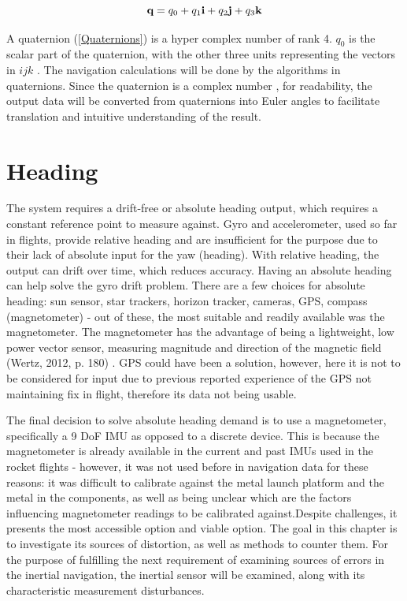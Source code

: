\begin{equation}\label{Quaternions}
	\textbf q = q_0 + q_1\textbf{i} + q_2\textbf{j} + q_3\textbf{k} 
\end{equation}

A quaternion (\ref{Quaternions}) is a hyper complex number of rank 4. $ {q_0} $ is the scalar part of the quaternion, with the other three units representing the vectors in ${i j k} $  \cite{fresk2013full}. The navigation calculations will be done by the algorithms in quaternions. Since the quaternion  is  a  complex  number \cite{fresk2013full}, for readability, the output data will be converted from quaternions into Euler angles to facilitate translation and intuitive understanding of the result.

\section{Heading}
 
The system requires a drift-free or absolute heading output, which requires a constant reference point to measure against. Gyro and accelerometer, used so far in flights, provide relative heading and are insufficient for the purpose due to their lack of absolute input for the yaw (heading). With relative heading, the output can drift over time, which reduces accuracy. Having an absolute heading can help solve the gyro drift problem. There are a few choices for absolute heading: sun sensor, star trackers, horizon tracker, cameras, GPS, compass (magnetometer) \cite{hu2015fundamental} - out of these, the most suitable and readily available was the magnetometer. The magnetometer has the advantage of being a lightweight, low power vector sensor, measuring magnitude and direction of the magnetic field (Wertz, 2012, p. 180) \cite{wertz2012spacecraft}. GPS could have been a solution, however, here it is not to be considered for input due to previous reported experience of the GPS not maintaining fix in flight, therefore its data not being usable. 
 
The final decision to solve absolute heading demand is to use a magnetometer, specifically a 9 DoF IMU as opposed to a discrete device. This is because the magnetometer is already available in the current and past IMUs used in the rocket flights - however, it was not used before in navigation data for these reasons: it was difficult to calibrate against the metal launch platform and the metal in the components, as well as being unclear which are the factors influencing magnetometer readings to be calibrated against.Despite challenges, it presents the most accessible option and viable option. The goal in this chapter is to investigate its sources of distortion, as well as methods to counter them. For the purpose of fulfilling the next requirement of examining sources of errors in the inertial navigation, the inertial sensor will be examined, along with its characteristic measurement disturbances. 
 
